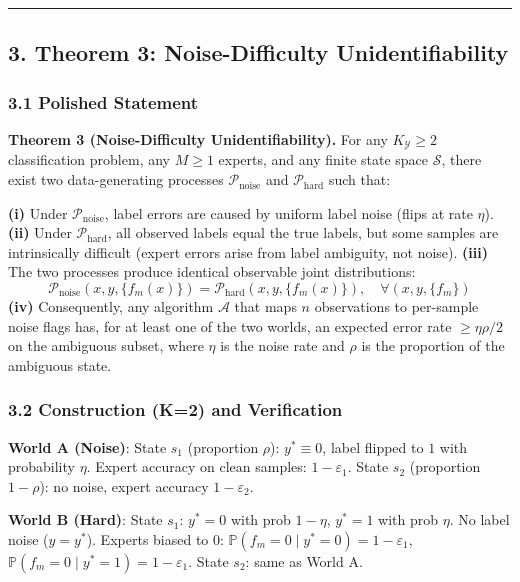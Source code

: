 \documentclass[
  12pt,
]{ctexart}
\begin{document}
\begin{center}\rule{0.5\linewidth}{0.5pt}\end{center}

\subsection{3. Theorem 3: Noise-Difficulty
Unidentifiability}\label{theorem-3-noise-difficulty-unidentifiability}

\subsubsection{3.1 Polished Statement}\label{polished-statement-2}

\textbf{Theorem 3 (Noise-Difficulty Unidentifiability).} For any
\(K_{\mathcal{Y}} \geq 2\) classification problem, any \(M \geq 1\)
experts, and any finite state space \(\mathcal{S}\), there exist two
data-generating processes \(\mathcal{P}_{\text{noise}}\) and
\(\mathcal{P}_{\text{hard}}\) such that:

\textbf{(i)} Under \(\mathcal{P}_{\text{noise}}\), label errors are
caused by uniform label noise (flips at rate \(\eta\)). \textbf{(ii)}
Under \(\mathcal{P}_{\text{hard}}\), all observed labels equal the true
labels, but some samples are intrinsically difficult (expert errors
arise from label ambiguity, not noise). \textbf{(iii)} The two processes
produce identical observable joint distributions:
\[\mathcal{P}_{\text{noise}}(x, y, \{f_m(x)\}) = \mathcal{P}_{\text{hard}}(x, y, \{f_m(x)\}), \quad \forall (x, y, \{f_m\})\]
\textbf{(iv)} Consequently, any algorithm \(\mathcal{A}\) that maps
\(n\) observations to per-sample noise flags has, for at least one of
the two worlds, an expected error rate \(\geq \eta\rho/2\) on the
ambiguous subset, where \(\eta\) is the noise rate and \(\rho\) is the
proportion of the ambiguous state.

\subsubsection{3.2 Construction (K=2) and
Verification}\label{construction-k2-and-verification}

\textbf{World A (Noise)}: State \(s_1\) (proportion \(\rho\)):
\(y^* \equiv 0\), label flipped to \(1\) with probability \(\eta\).
Expert accuracy on clean samples: \(1-\varepsilon_1\). State \(s_2\)
(proportion \(1-\rho\)): no noise, expert accuracy \(1-\varepsilon_2\).

\textbf{World B (Hard)}: State \(s_1\): \(y^* = 0\) with prob
\(1-\eta\), \(y^* = 1\) with prob \(\eta\). No label noise
(\(y = y^*\)). Experts biased to 0:
\(\mathbb{P}(f_m=0 \mid y^*=0) = 1-\varepsilon_1\),
\(\mathbb{P}(f_m=0 \mid y^*=1) = 1-\varepsilon_1\). State \(s_2\): same
as World A.
\end{document}
